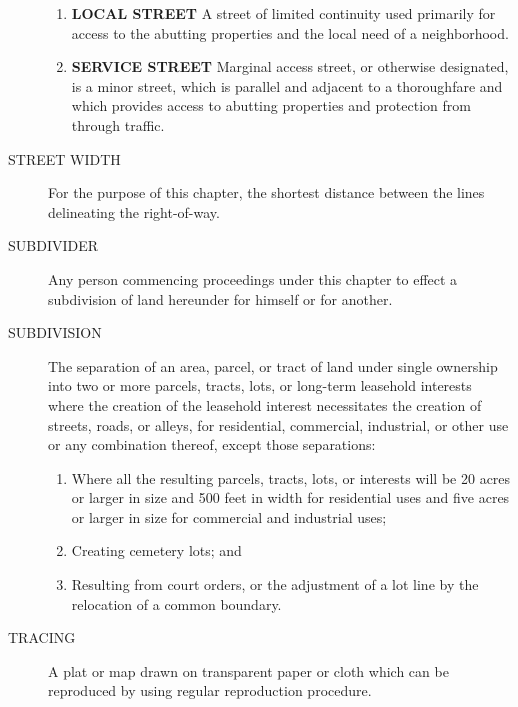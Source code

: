 \begin{description}
\begin{enumerate}
            \item \textbf{LOCAL STREET} A street of limited continuity used primarily for access to the abutting properties and the local need of a neighborhood.
            \item \textbf{SERVICE STREET} Marginal access street, or otherwise designated, is a minor street, which is parallel and adjacent to a thoroughfare and which provides access to abutting properties and protection from through traffic.
        \end{enumerate}
    \item[STREET WIDTH] For the purpose of this chapter, the shortest distance between the lines delineating the right-of-way.
    \item[SUBDIVIDER] Any person commencing proceedings under this chapter to effect a subdivision of land hereunder for himself or for another.
    \item[SUBDIVISION] The separation of an area, parcel, or tract of land under single ownership into two or more parcels, tracts, lots, or long-term leasehold interests where the creation of the leasehold interest necessitates the creation of streets, roads, or alleys, for residential, commercial, industrial, or other use or any combination thereof, except those separations:
        \begin{enumerate}
            \item Where all the resulting parcels, tracts, lots, or interests will be 20 acres or larger in size and 500 feet in width for residential uses and five acres or larger in size for commercial and industrial uses;
            \item Creating cemetery lots; and
            \item Resulting from court orders, or the adjustment of a lot line by the relocation of a common boundary.
        \end{enumerate}
    \item[TRACING] A plat or map drawn on transparent paper or cloth which can be reproduced by using regular reproduction procedure.
\end{description}


\setcounter{section}{14}
